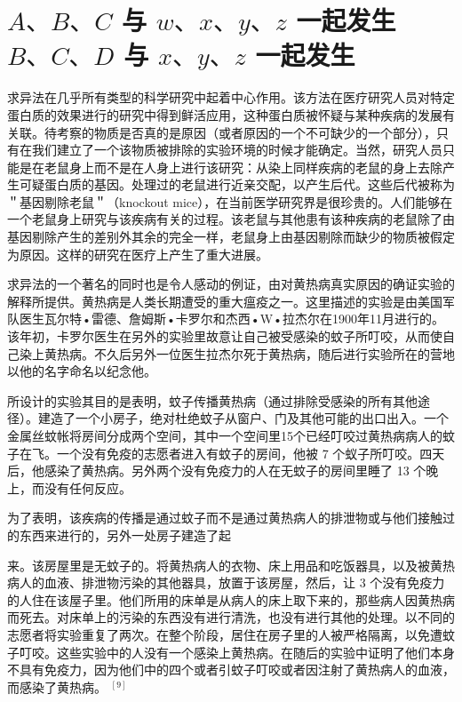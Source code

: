 \section*{$A 、 B 、 C$ 与 $w 、 x 、 y 、 z$ 一起发生 \\
 $B 、 C 、 D$ 与 $x 、 y 、 z$ 一起发生}
求异法在几乎所有类型的科学研究中起着中心作用。该方法在医疗研究人员对特定蛋白质的效果进行的研究中得到鲜活应用，这种蛋白质被怀疑与某种疾病的发展有关联。待考察的物质是否真的是原因（或者原因的一个不可缺少的一个部分），只有在我们建立了一个该物质被排除的实验环境的时候才能确定。当然，研究人员只能是在老鼠身上而不是在人身上进行该研究：从染上同样疾病的老鼠的身上去除产生可疑蛋白质的基因。处理过的老鼠进行近亲交配，以产生后代。这些后代被称为＂基因剔除老鼠＂（knockout mice），在当前医学研究界是很珍贵的。人们能够在一个老鼠身上研究与该疾病有关的过程。该老鼠与其他患有该种疾病的老鼠除了由基因剔除产生的差别外其余的完全一样，老鼠身上由基因剔除而缺少的物质被假定为原因。这样的研究在医疗上产生了重大进展。

求异法的一个著名的同时也是令人感动的例证，由对黄热病真实原因的确证实验的解释所提供。黄热病是人类长期遭受的重大瘟疫之一。这里描述的实验是由美国军队医生瓦尔特•雷德、詹姆斯•卡罗尔和杰西•W•拉杰尔在1900年11月进行的。该年初，卡罗尔医生在另外的实验里故意让自己被受感染的蚊子所叮咬，从而使自己染上黄热病。不久后另外一位医生拉杰尔死于黄热病，随后进行实验所在的营地以他的名字命名以纪念他。

所设计的实验其目的是表明，蚊子传播黄热病（通过排除受感染的所有其他途径）。建造了一个小房子，绝对杜绝蚊子从窗户、门及其他可能的出口出入。一个金属丝蚊帐将房间分成两个空间，其中一个空间里15个已经叮咬过黄热病病人的蚊子在飞。一个没有免疫的志愿者进入有蚊子的房间，他被 7 个蚁子所叮咬。四天后，他感染了黄热病。另外两个没有免疫力的人在无蚊子的房间里睡了 13 个晚上，而没有任何反应。

为了表明，该疾病的传播是通过蚊子而不是通过黄热病人的排泄物或与他们接触过的东西来进行的，另外一处房子建造了起

\begin{displayquote}
来。该房屋里是无蚊子的。将黄热病人的衣物、床上用品和吃饭器具，以及被黄热病人的血液、排泄物污染的其他器具，放置于该房屋，然后，让 3 个没有免疫力的人住在该屋子里。他们所用的床单是从病人的床上取下来的，那些病人因黄热病而死去。对床单上的污染的东西没有进行清洗，也没有进行其他的处理。以不同的志愿者将实验重复了两次。在整个阶段，居住在房子里的人被严格隔离，以免遭蚊子叮咬。这些实验中的人没有一个感染上黄热病。在随后的实验中证明了他们本身不具有免疫力，因为他们中的四个或者引蚊子叮咬或者因注射了黄热病人的血液，而感染了黄热病。 ${ }^{[9]}$
\end{displayquote}

